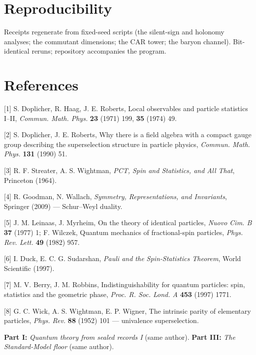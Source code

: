 \documentclass[11pt]{article}
\begin{document}
\section*{Reproducibility}
Receipts regenerate from fixed-seed scripts (the silent-sign and holonomy analyses; the commutant dimensions; the CAR tower; the baryon channel).  Bit-identical reruns; repository accompanies the program.

\section*{References}
[1] S. Doplicher, R. Haag, J. E. Roberts, Local observables and particle statistics I–II, \emph{Commun. Math. Phys.} \textbf{23} (1971) 199, \textbf{35} (1974) 49.

[2] S. Doplicher, J. E. Roberts, Why there is a field algebra with a compact gauge group describing the superselection structure in particle physics, \emph{Commun. Math. Phys.} \textbf{131} (1990) 51.

[3] R. F. Streater, A. S. Wightman, \emph{PCT, Spin and Statistics, and All That}, Princeton (1964).

[4] R. Goodman, N. Wallach, \emph{Symmetry, Representations, and Invariants}, Springer (2009) — Schur–Weyl duality.

[5] J. M. Leinaas, J. Myrheim, On the theory of identical particles, \emph{Nuovo Cim. B} \textbf{37} (1977) 1; F. Wilczek, Quantum mechanics of fractional-spin particles, \emph{Phys. Rev. Lett.} \textbf{49} (1982) 957.

[6] I. Duck, E. C. G. Sudarshan, \emph{Pauli and the Spin-Statistics Theorem}, World Scientific (1997).

[7] M. V. Berry, J. M. Robbins, Indistinguishability for quantum particles: spin, statistics and the geometric phase, \emph{Proc. R. Soc. Lond. A} \textbf{453} (1997) 1771.

[8] G. C. Wick, A. S. Wightman, E. P. Wigner, The intrinsic parity of elementary particles, \emph{Phys. Rev.} \textbf{88} (1952) 101 — univalence superselection.

\textbf{Part I:} \emph{Quantum theory from sealed records I} (same author). \textbf{Part III:} \emph{The Standard-Model floor} (same author).
\end{document}
